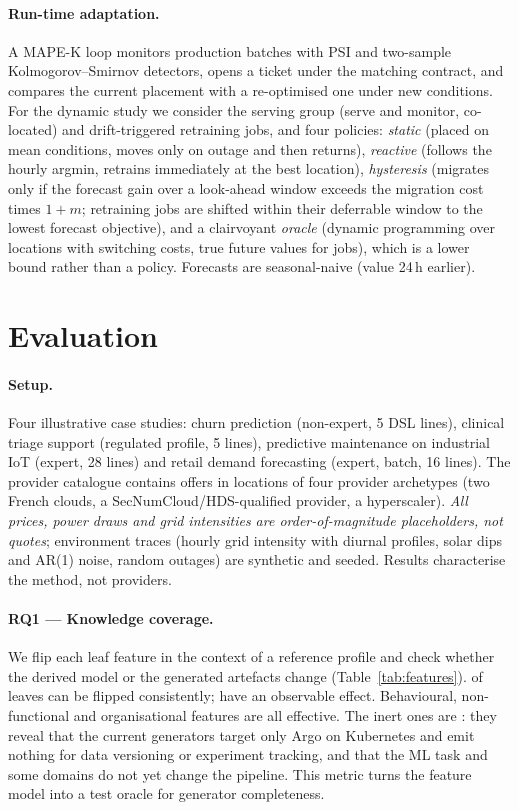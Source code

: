 \documentclass[10pt,a4paper]{article}
\begin{document}
\paragraph{Run-time adaptation.} A MAPE-K loop monitors production batches with
PSI and two-sample Kolmogorov--Smirnov detectors, opens a ticket under the matching
contract, and compares the current placement with a re-optimised one under new
conditions. For the dynamic study we consider the serving group (serve and monitor,
co-located) and drift-triggered retraining jobs, and four policies:
\emph{static} (placed on mean conditions, moves only on outage and then returns),
\emph{reactive} (follows the hourly argmin, retrains immediately at the best
location), \emph{hysteresis} (migrates only if the forecast gain over a look-ahead
window exceeds the migration cost times \(1+m\); retraining jobs are shifted within
their deferrable window to the lowest forecast objective), and a clairvoyant
\emph{oracle} (dynamic programming over locations with switching costs, true future
values for jobs), which is a lower bound rather than a policy. Forecasts are
seasonal-naive (value 24\,h earlier).

\section{Evaluation}
\paragraph{Setup.} Four illustrative case studies: churn prediction (non-expert,
5 DSL lines), clinical triage support (regulated profile, 5 lines), predictive
maintenance on industrial IoT (expert, 28 lines) and retail demand forecasting
(expert, batch, 16 lines). The provider catalogue contains \NOffers{} offers in
\NLocations{} locations of four provider archetypes (two French clouds, a
SecNumCloud/HDS-qualified provider, a hyperscaler). \emph{All prices, power draws and
grid intensities are order-of-magnitude placeholders, not quotes}; environment traces
(hourly grid intensity with diurnal profiles, solar dips and AR(1) noise, random
outages) are synthetic and seeded. Results characterise the method, not providers.

\paragraph{RQ1 --- Knowledge coverage.} We flip each leaf feature in the context of
a reference profile and check whether the derived model or the generated artefacts
change (Table~\ref{tab:features}). \FeatTested{} of \FeatLeaves{} leaves can be
flipped consistently; \FeatEffective{} have an observable effect. Behavioural,
non-functional and organisational features are all effective. The inert ones are
\FeatNoEffect{}: they reveal that the current generators target only Argo on
Kubernetes and emit nothing for data versioning or experiment tracking, and that
the ML task and some domains do not yet change the pipeline. This metric turns the
feature model into a test oracle for generator completeness.
\end{document}
